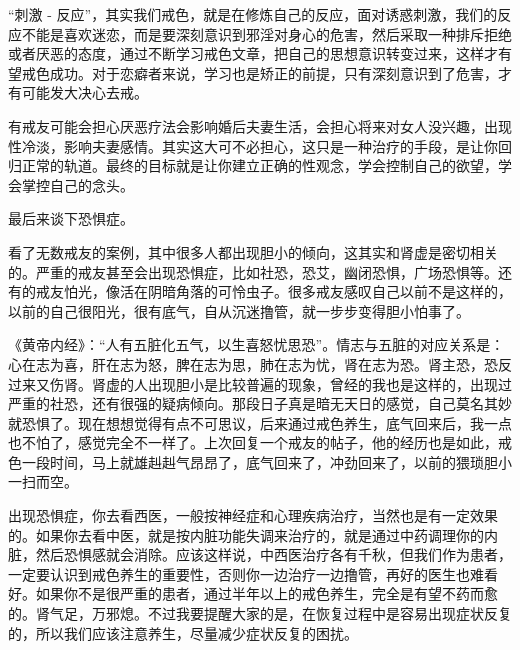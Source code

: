 \documentclass{ctexart}
\begin{document}
“刺激 - 反应”，其实我们戒色，就是在修炼自己的反应，面对诱惑刺激，我们的反应不能是喜欢迷恋，而是要深刻意识到邪淫对身心的危害，然后采取一种排斥拒绝或者厌恶的态度，通过不断学习戒色文章，把自己的思想意识转变过来，这样才有望戒色成功。对于恋癖者来说，学习也是矫正的前提，只有深刻意识到了危害，才有可能发大决心去戒。

有戒友可能会担心厌恶疗法会影响婚后夫妻生活，会担心将来对女人没兴趣，出现性冷淡，影响夫妻感情。其实这大可不必担心，这只是一种治疗的手段，是让你回归正常的轨道。最终的目标就是让你建立正确的性观念，学会控制自己的欲望，学会掌控自己的念头。

最后来谈下恐惧症。

看了无数戒友的案例，其中很多人都出现胆小的倾向，这其实和肾虚是密切相关的。严重的戒友甚至会出现恐惧症，比如社恐，恐艾，幽闭恐惧，广场恐惧等。还有的戒友怕光，像活在阴暗角落的可怜虫子。很多戒友感叹自己以前不是这样的，以前的自己很阳光，很有底气，自从沉迷撸管，就一步步变得胆小怕事了。

《黄帝内经》：“人有五脏化五气，以生喜怒忧思恐”。情志与五脏的对应关系是：心在志为喜，肝在志为怒，脾在志为思，肺在志为忧，肾在志为恐。肾主恐，恐反过来又伤肾。肾虚的人出现胆小是比较普遍的现象，曾经的我也是这样的，出现过严重的社恐，还有很强的疑病倾向。那段日子真是暗无天日的感觉，自己莫名其妙就恐惧了。现在想想觉得有点不可思议，后来通过戒色养生，底气回来后，我一点也不怕了，感觉完全不一样了。上次回复一个戒友的帖子，他的经历也是如此，戒色一段时间，马上就雄赳赳气昂昂了，底气回来了，冲劲回来了，以前的猥琐胆小一扫而空。

出现恐惧症，你去看西医，一般按神经症和心理疾病治疗，当然也是有一定效果的。如果你去看中医，就是按内脏功能失调来治疗的，就是通过中药调理你的内脏，然后恐惧感就会消除。应该这样说，中西医治疗各有千秋，但我们作为患者，一定要认识到戒色养生的重要性，否则你一边治疗一边撸管，再好的医生也难看好。如果你不是很严重的患者，通过半年以上的戒色养生，完全是有望不药而愈的。肾气足，万邪熄。不过我要提醒大家的是，在恢复过程中是容易出现症状反复的，所以我们应该注意养生，尽量减少症状反复的困扰。
\end{document}
